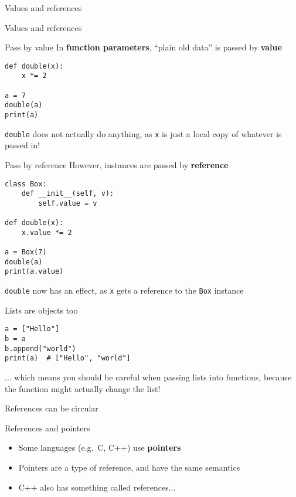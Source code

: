 \begin{frame}{Values and references}
	\socrative
	
\end{frame}

\begin{frame}{Values and references}
	\socrative
	
\end{frame}

\begin{frame}[fragile]{Pass by value}
	\pause
	In \textbf{function parameters},
	``plain old data'' is passed by \textbf{value}
	\pause
	\begin{lstlisting}
def double(x):
    x *= 2

a = 7
double(a)
print(a)
	\end{lstlisting}
	\pause
	\lstinline{double} does not actually do anything, as \lstinline{x} is just a local copy of
		whatever is passed in!
\end{frame}

\begin{frame}[fragile]{Pass by reference}
	\pause
	However, instances are passed by \textbf{reference}
	\begin{lstlisting}
class Box:
    def __init__(self, v):
        self.value = v

def double(x):
    x.value *= 2

a = Box(7)
double(a)
print(a.value)
	\end{lstlisting}
	\pause
	\lstinline{double} now has an effect, as \lstinline{x} gets a reference to the \lstinline{Box} instance
\end{frame}

\begin{frame}[fragile]{Lists are objects too}
	\pause
	\begin{lstlisting}
a = ["Hello"]
b = a
b.append("world")
print(a)  # ["Hello", "world"]
	\end{lstlisting}
	\pause
	... which means you should be careful when passing lists into functions,
	because the function might actually change the list!
\end{frame}

\begin{frame}[fragile]{References can be circular}
	
\end{frame}

\begin{frame}{References and pointers}
    \begin{itemize}
        \pause\item Some languages (e.g.\ C, C++) use \textbf{pointers}
        \pause\item Pointers are a type of reference, and have the same semantics
        \pause\item C++ also has something called references...
    \end{itemize}
\end{frame}
